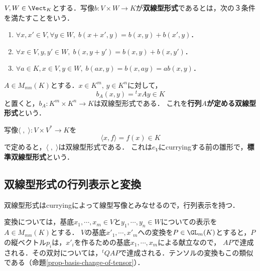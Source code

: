 \documentclass[uplatex, dvipdfmx]{jsreport}
\begin{document}
\begin{definition}
    $V,W\in\Vect_K$とする．写像$b:V\times W\to K$が\textbf{双線型形式}であるとは，次の３条件を満たすことをいう．
    \begin{enumerate}
        \item $\forall x,x'\in V,\forall y\in W,\;b(x+x',y)=b(x,y)+b(x',y)$．
        \item $\forall x\in V,y,y'\in W,\;b(x,y+y')=b(x,y)+b(x,y')$．
        \item $\forall a\in K,x\in V,y\in W,\;b(ax,y)=b(x,ay)=ab(x,y)$．
    \end{enumerate}
\end{definition}

\begin{example}[行列$A$が定める双線型形式]
    $A\in M_{mn}(K)$とする．$x\in K^m,\,y\in K^n$に対して，\[b_A(x,y)={}^t\!xAy\in K\]と置くと，$b_A:K^m\times K^n\to K$は双線型形式である．
    これを\textbf{行列$A$が定める双線型形式}という．
\end{example}
\begin{example}[標準双線型形式]
    写像$\langle\;,\;\rangle:V\times V^*\to K$を\[\langle x,f\rangle=f(x)\in K\]で定めると，$\langle\;,\;\rangle$は双線型形式である．
    これは$e_V$にcurryingする前の雛形で，\textbf{標準双線型形式}という．
\end{example}

\subsection{双線型形式の行列表示と変換}

\begin{tcolorbox}[colframe=ForestGreen, colback=ForestGreen!10!white, breakable]
    双線型形式はcurryingによって線型写像とみなせるので，行列表示を持つ．

    変換については，基底$x_1,\cdots,x_m\in V$と$y_1,\cdots,y_n\in W$についての表示を$A\in M_{mn}(K)$とする．
    $V$の基底$x'_1,\cdots,x'_m$への変換を$P\in\GL_m(K)$とすると，$P$の縦ベクトル$p_i$は，$x'_i$を作るための基底$x_1,\cdots,x_m$による献立なので，
    $AP$で達成される．その双対については，${}^t\!QAP$で達成される．テンソルの変換もこの類似である（命題\ref{prop-basis-change-of-tensor}）．
\end{tcolorbox}
\end{document}
